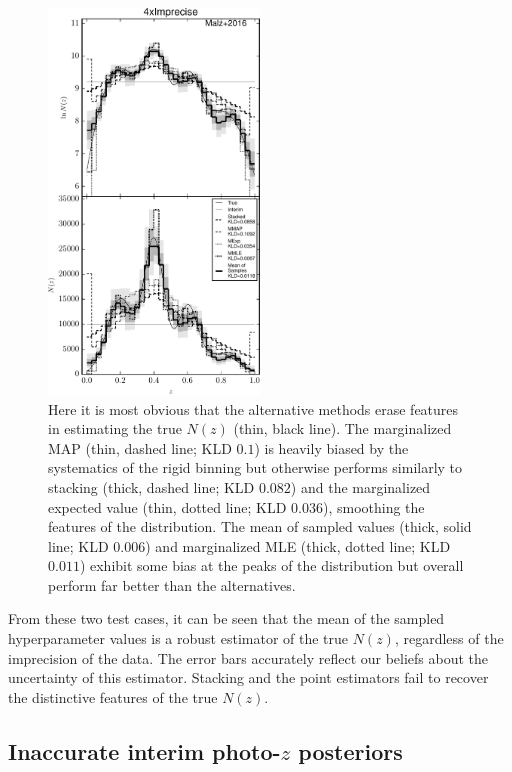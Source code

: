 \documentclass[preprint]{aastex}
\begin{document}
\begin{figure}
\includegraphics[width=0.5\textwidth]{figs/sig4/comps.pdf}
\caption{Here it is most obvious that the alternative methods erase features in 
estimating the true $N(z)$ (thin, black line).  The marginalized MAP (thin, 
dashed line; KLD $0.1$) is heavily biased by the systematics of the rigid 
binning but otherwise performs similarly to stacking (thick, dashed line; KLD 
$0.082$) and the marginalized expected value (thin, dotted line; KLD $0.036$), 
smoothing the features of the distribution.  The mean of sampled values (thick, 
solid line; KLD $0.006$) and marginalized MLE (thick, dotted line; KLD $0.011$) 
exhibit some bias at the peaks of the distribution but overall perform far 
better than the alternatives.}
\label{fig:sig4-comp}
\end{figure}

From these two test cases, it can be seen that the mean of the sampled 
hyperparameter values is a robust estimator of the true $N(z)$, regardless of 
the imprecision of the data.  The error bars accurately reflect our beliefs 
about the uncertainty of this estimator.  Stacking and the point estimators 
fail to recover the distinctive features of the true $N(z)$.

\subsection{Inaccurate interim photo-$z$ posteriors}
\label{sec:multi}
\end{document}
